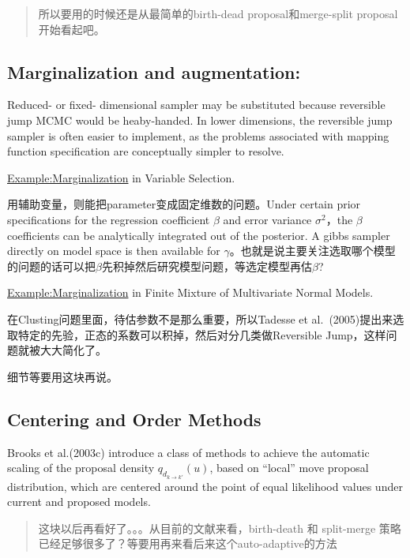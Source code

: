 \documentclass[
]{book}
\theoremstyle{definition}
\theoremstyle{definition}
\theoremstyle{definition}
\theoremstyle{remark}
\begin{document}
\begin{quote}
所以要用的时候还是从最简单的birth-dead proposal和merge-split proposal开始看起吧。
\end{quote}

\hypertarget{marginalization-and-augmentation}{%
\subsection{Marginalization and augmentation:}\label{marginalization-and-augmentation}}

Reduced- or fixed- dimensional sampler may be substituted because reversible jump MCMC would be heaby-handed.
In lower dimensions, the reversible jump sampler is often easier to implement, as the problems associated with mapping function specification are conceptually simpler to resolve.

\url{Example:Marginalization} in Variable Selection.

用辅助变量，则能把parameter变成固定维数的问题。Under certain prior specifications for the regression coefficient \(\beta\) and error variance \(\sigma^2\)，the \(\beta\) coefficients can be analytically integrated out of the posterior. A gibbs sampler directly on model space is then available for \(\gamma\)。也就是说主要关注选取哪个模型的问题的话可以把\(\beta\)先积掉然后研究模型问题，等选定模型再估\(\beta\)?

\url{Example:Marginalization} in Finite Mixture of Multivariate Normal Models.

在Clusting问题里面，待估参数不是那么重要，所以Tadesse et al.~(2005)提出来选取特定的先验，正态的系数可以积掉，然后对分几类做Reversible Jump，这样问题就被大大简化了。

细节等要用这块再说。

\hypertarget{centering-and-order-methods}{%
\subsection{Centering and Order Methods}\label{centering-and-order-methods}}

Brooks et al.(2003c) introduce a class of methods to achieve the automatic scaling of the proposal density \(q_{d_{k\rightarrow k'}}(u)\), based on ``local'' move proposal distribution, which are centered around the point of equal likelihood values under current and proposed models.

\begin{quote}
这块以后再看好了。。。从目前的文献来看，birth-death 和 split-merge 策略已经足够很多了？等要用再来看后来这个auto-adaptive的方法
\end{quote}
\end{document}
